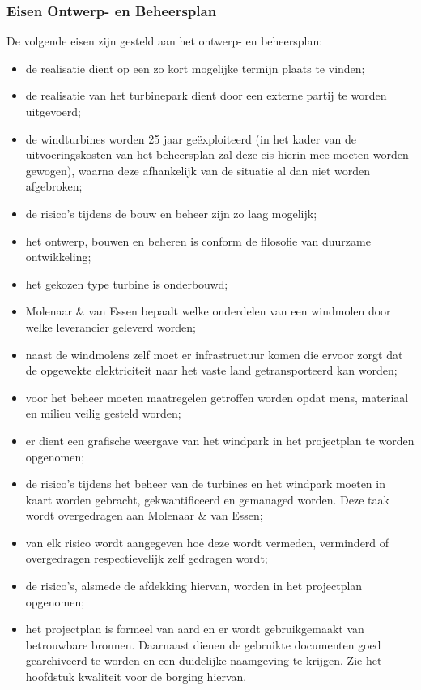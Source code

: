 \documentclass[numbers=endperiod]{scrartcl}
\begin{document}
	\subsubsection{Eisen Ontwerp- en Beheersplan}
	De volgende eisen zijn gesteld aan het ontwerp- en beheersplan:
	\begin{itemize}
		\item de realisatie dient op een zo kort mogelijke termijn plaats te vinden;
		\item de realisatie van het turbinepark dient door een externe partij te worden uitgevoerd;
		\item de windturbines worden 25 jaar geëxploiteerd (in het kader van de uitvoeringskosten van het beheersplan zal deze eis hierin mee moeten worden gewogen), waarna deze afhankelijk van de situatie al dan niet worden afgebroken;
		\item de risico's tijdens de bouw en beheer zijn zo laag mogelijk;
		\item het ontwerp, bouwen en beheren is conform de filosofie van duurzame ontwikkeling;
		\item het gekozen type turbine is onderbouwd;
		\item Molenaar \& van Essen bepaalt welke onderdelen van een windmolen door welke leverancier geleverd worden;
		\item naast de windmolens zelf moet er infrastructuur komen die ervoor zorgt dat de opgewekte elektriciteit naar het vaste land getransporteerd kan worden;
		\item voor het beheer moeten maatregelen getroffen worden opdat mens, materiaal en milieu veilig gesteld worden;
		\item er dient een grafische weergave van het windpark in het projectplan te worden opgenomen;
		\item de risico’s tijdens het beheer van de turbines en het windpark moeten in kaart worden gebracht, gekwantificeerd en gemanaged worden. Deze taak wordt overgedragen aan Molenaar \& van Essen;
		\item van elk risico wordt aangegeven hoe deze wordt vermeden, verminderd of overgedragen respectievelijk zelf gedragen wordt;
		\item de risico's, alsmede de afdekking hiervan, worden in het projectplan opgenomen;
		\item het projectplan is formeel van aard en er wordt gebruikgemaakt van betrouwbare bronnen. Daarnaast dienen de gebruikte documenten goed gearchiveerd te worden en een duidelijke naamgeving te krijgen. Zie het hoofdstuk kwaliteit voor de borging hiervan. 
	\end{itemize}
	
\end{document}
